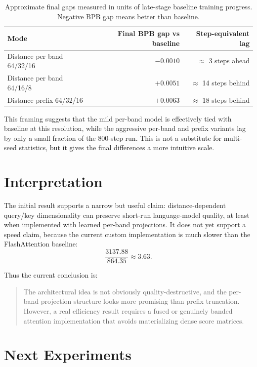 \documentclass[11pt]{article}
\begin{document}
\begin{table}[h]
\centering
\begin{tabular}{lrr}
\toprule
Mode & Final BPB gap vs baseline & Step-equivalent lag \\
\midrule
Distance per band 64/32/16 & $-0.0010$ & $\approx$ 3 steps ahead \\
Distance per band 64/16/8 & $+0.0051$ & $\approx$ 14 steps behind \\
Distance prefix 64/32/16 & $+0.0063$ & $\approx$ 18 steps behind \\
\bottomrule
\end{tabular}
\caption{Approximate final gaps measured in units of late-stage baseline training progress. Negative BPB gap means better than baseline.}
\end{table}

This framing suggests that the mild per-band model is effectively tied with baseline at this resolution, while the aggressive per-band and prefix variants lag by only a small fraction of the 800-step run. This is not a substitute for multi-seed statistics, but it gives the final differences a more intuitive scale.

\section{Interpretation}

The initial result supports a narrow but useful claim: distance-dependent query/key dimensionality can preserve short-run language-model quality, at least when implemented with learned per-band projections. It does not yet support a speed claim, because the current custom implementation is much slower than the FlashAttention baseline:
\begin{equation}
    \frac{3137.88}{864.35} \approx 3.63.
\end{equation}

Thus the current conclusion is:
\begin{quote}
The architectural idea is not obviously quality-destructive, and the per-band projection structure looks more promising than prefix truncation. However, a real efficiency result requires a fused or genuinely banded attention implementation that avoids materializing dense score matrices.
\end{quote}

\section{Next Experiments}
\end{document}

